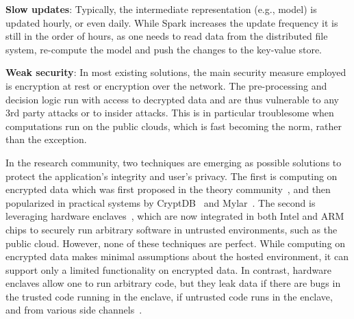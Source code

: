 {\bf Slow updates}: Typically, the intermediate representation (e.g., model) is updated hourly, or even daily. While Spark increases the update frequency it is still in the order of hours, as one needs to read data from the distributed file system, re-compute the model and push the changes to the key-value store.

{\bf Weak security}: In most existing solutions, the main security measure employed is encryption at rest or encryption over the network. The pre-processing and decision logic run with access to decrypted data and are thus vulnerable to any 3rd party attacks or to insider attacks. This is in particular troublesome when computations run on the public clouds, which is fast becoming the norm, rather than the exception. 

In the research community, two techniques are emerging as possible solutions to protect the application’s integrity and user’s privacy. The first is computing on encrypted data which was first proposed in the theory community~\cite{databanks78, gentry2009fully}, and then popularized in practical systems by CryptDB~\cite{cryptdb} and Mylar~\cite{mylar}. The second is leveraging hardware enclaves~\cite{IntelSGX}, which are now integrated in both Intel and ARM chips to securely run arbitrary software in untrusted environments, such as the public cloud. However, none of these techniques are perfect. While computing on encrypted data makes minimal assumptions about the hosted environment, it can support only a limited functionality on encrypted data. In contrast, hardware enclaves allow one to run arbitrary code, but they leak data if there are bugs in the trusted code running in the enclave, if untrusted code runs in the enclave, and from various side channels~\cite{SGXmemorychannel, SGXnetworkchannel}.

